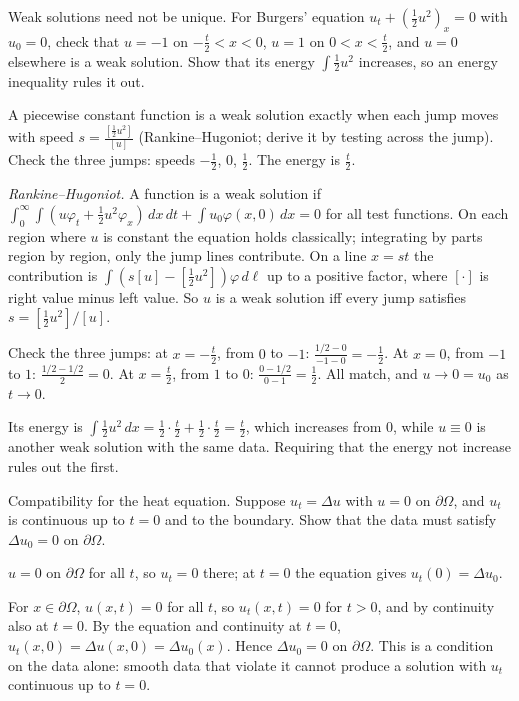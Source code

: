 \begin{exercise}
  Weak solutions need not be unique. For Burgers' equation $u_t + (\frac12u^2)_x = 0$ with $u_0 = 0$, check that $u = -1$ on $-\frac t2 < x < 0$, $u = 1$ on $0 < x < \frac t2$, and $u = 0$ elsewhere is a weak solution. Show that its energy $\int\frac12u^2$ increases, so an energy inequality rules it out.
  \begin{hint}
    A piecewise constant function is a weak solution exactly when each jump moves with speed $s = \frac{[\frac12u^2]}{[u]}$ (Rankine--Hugoniot; derive it by testing across the jump). Check the three jumps: speeds $-\frac12$, $0$, $\frac12$. The energy is $\frac t2$.
  \end{hint}
  \begin{solution}
    \emph{Rankine--Hugoniot.} A function is a weak solution if $\int_0^\infty\!\int(u\varphi_t + \frac12u^2\varphi_x)\,dx\,dt + \int u_0\varphi(x,0)\,dx = 0$ for all test functions. On each region where $u$ is constant the equation holds classically; integrating by parts region by region, only the jump lines contribute. On a line $x = st$ the contribution is $\int(s[u] - [\frac12u^2])\varphi\,d\ell$ up to a positive factor, where $[\cdot]$ is right value minus left value. So $u$ is a weak solution iff every jump satisfies $s = [\frac12u^2]/[u]$.

    Check the three jumps: at $x = -\frac t2$, from $0$ to $-1$: $\frac{1/2 - 0}{-1 - 0} = -\frac12$. At $x = 0$, from $-1$ to $1$: $\frac{1/2 - 1/2}{2} = 0$. At $x = \frac t2$, from $1$ to $0$: $\frac{0 - 1/2}{0 - 1} = \frac12$. All match, and $u \to 0 = u_0$ as $t \to 0$.

    Its energy is $\int\frac12u^2\,dx = \frac12\cdot\frac t2 + \frac12\cdot\frac t2 = \frac t2$, which increases from $0$, while $u \equiv 0$ is another weak solution with the same data. Requiring that the energy not increase rules out the first.
  \end{solution}
\end{exercise}

\begin{exercise}
  Compatibility for the heat equation. Suppose $u_t = \Delta u$ with $u = 0$ on $\partial\Omega$, and $u_t$ is continuous up to $t = 0$ and to the boundary. Show that the data must satisfy $\Delta u_0 = 0$ on $\partial\Omega$.
  \begin{hint}
    $u = 0$ on $\partial\Omega$ for all $t$, so $u_t = 0$ there; at $t = 0$ the equation gives $u_t(0) = \Delta u_0$.
  \end{hint}
  \begin{solution}
    For $x \in \partial\Omega$, $u(x,t) = 0$ for all $t$, so $u_t(x,t) = 0$ for $t > 0$, and by continuity also at $t = 0$. By the equation and continuity at $t = 0$, $u_t(x,0) = \Delta u(x,0) = \Delta u_0(x)$. Hence $\Delta u_0 = 0$ on $\partial\Omega$. This is a condition on the data alone: smooth data that violate it cannot produce a solution with $u_t$ continuous up to $t = 0$.
  \end{solution}
\end{exercise}

